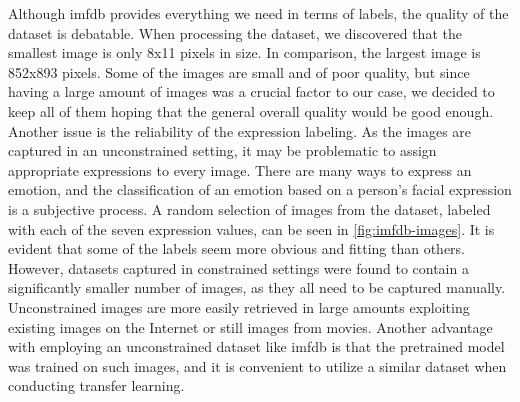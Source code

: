 \noindent Although \acrshort{imfdb} provides everything we need in terms of labels, the quality of the dataset is debatable. When processing the dataset, we discovered that the smallest image is only 8x11 pixels in size. In comparison, the largest image is 852x893 pixels. Some of the images are small and of poor quality, but since having a large amount of images was a crucial factor to our case, we decided to keep all of them hoping that the general overall quality would be good enough. Another issue is the reliability of the expression labeling. As the images are captured in an unconstrained setting, it may be problematic to assign appropriate expressions to every image. There are many ways to express an emotion, and the classification of an emotion based on a person's facial expression is a subjective process. A random selection of images from the dataset, labeled with each of the seven expression values, can be seen in \autoref{fig:imfdb-images}. It is evident that some of the labels seem more obvious and fitting than others. However, datasets captured in constrained settings were found to contain a significantly smaller number of images, as they all need to be captured manually. Unconstrained images are more easily retrieved in large amounts exploiting existing images on the Internet or still images from movies. Another advantage with employing an unconstrained dataset like \acrshort{imfdb} is that the pretrained model was trained on such images, and it is convenient to utilize a similar dataset when conducting transfer learning.

